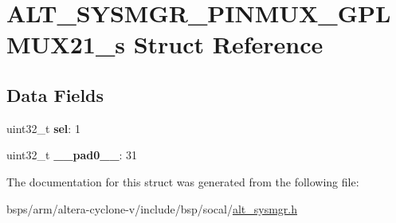 \hypertarget{structALT__SYSMGR__PINMUX__GPLMUX21__s}{}\section{A\+L\+T\+\_\+\+S\+Y\+S\+M\+G\+R\+\_\+\+P\+I\+N\+M\+U\+X\+\_\+\+G\+P\+L\+M\+U\+X21\+\_\+s Struct Reference}
\label{structALT__SYSMGR__PINMUX__GPLMUX21__s}
\subsection*{Data Fields}
\begin{DoxyCompactItemize}
\item 
\mbox{\label{structALT__SYSMGR__PINMUX__GPLMUX21__s_a02fa6eb92f0cdbfdb49941999cc1e966}} 
uint32\+\_\+t {\bfseries sel}\+: 1
\item 
\mbox{\label{structALT__SYSMGR__PINMUX__GPLMUX21__s_aeb23ad4e6488865f2215ee28941b1ba5}} 
uint32\+\_\+t {\bfseries \+\_\+\+\_\+pad0\+\_\+\+\_\+}\+: 31
\end{DoxyCompactItemize}


The documentation for this struct was generated from the following file\+:\begin{DoxyCompactItemize}
\item 
bsps/arm/altera-\/cyclone-\/v/include/bsp/socal/\mbox{\hyperlink{alt__sysmgr_8h}{alt\+\_\+sysmgr.\+h}}\end{DoxyCompactItemize}
